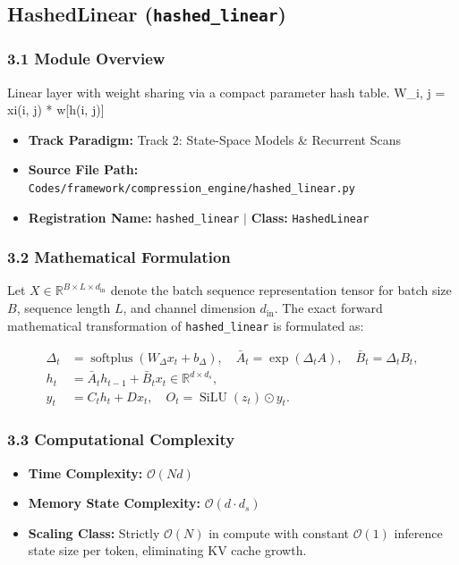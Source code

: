 \subsection{HashedLinear (\texttt{hashed\_linear})}
\label{sec:app_module_hashed_linear}

\subsubsection*{3.1 Module Overview}
Linear layer with weight sharing via a compact parameter hash table. W\_{i, j} = xi(i, j) * w[h(i, j)]
\begin{itemize}
    \item \textbf{Track Paradigm:} Track 2: State-Space Models & Recurrent Scans
    \item \textbf{Source File Path:} \texttt{Codes/framework/compression\_engine/hashed\_linear.py}
    \item \textbf{Registration Name:} \texttt{hashed\_linear} $\mid$ \textbf{Class:} \texttt{HashedLinear}
\end{itemize}

\subsubsection*{3.2 Mathematical Formulation}
Let $X \in \mathbb{R}^{B \times L \times d_{\text{in}}}$ denote the batch sequence representation tensor for batch size $B$, sequence length $L$, and channel dimension $d_{\text{in}}$. The exact forward mathematical transformation of \texttt{hashed\_linear} is formulated as:

\begin{align}
\Delta_t &= \operatorname{softplus}(W_\Delta x_t + b_\Delta), \quad \bar{A}_t = \exp(\Delta_t A), \quad \bar{B}_t = \Delta_t B_t, \\
h_t &= \bar{A}_t h_{t-1} + \bar{B}_t x_t \in \mathbb{R}^{d \times d_s}, \\
y_t &= C_t h_t + D x_t, \quad O_t = \operatorname{SiLU}(z_t) \odot y_t.
\end{align}


\subsubsection*{3.3 Computational Complexity}
\begin{itemize}
    \item \textbf{Time Complexity:} $\mathcal{O}(N d)$
    \item \textbf{Memory State Complexity:} $\mathcal{O}(d \cdot d_s)$
    \item \textbf{Scaling Class:} Strictly $\mathcal{O}(N)$ in compute with constant $\mathcal{O}(1)$ inference state size per token, eliminating KV cache growth.
\end{itemize}


